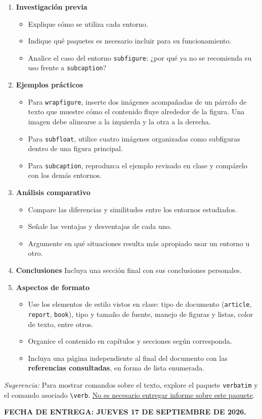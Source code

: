 \documentclass{article}
\begin{document}
\begin{enumerate}
    \item \textbf{Investigación previa}
    \begin{itemize}
        \item Explique cómo se utiliza cada entorno.  
        \item Indique qué paquetes es necesario incluir para su funcionamiento.  
        \item Analice el caso del entorno \texttt{subfigure}: ¿por qué ya no se recomienda su uso frente a \texttt{subcaption}?  
    \end{itemize}
    
    \item \textbf{Ejemplos prácticos}
    \begin{itemize}
        \item Para \texttt{wrapfigure}, inserte dos imágenes acompañadas de un párrafo de texto que muestre cómo el contenido fluye alrededor de la figura. Una imagen debe alinearse a la izquierda y la otra a la derecha.  
        \item Para \texttt{subfloat}, utilice cuatro imágenes organizadas como subfiguras dentro de una figura principal.  
        \item Para \texttt{subcaption}, reproduzca el ejemplo revisado en clase y compárelo con los demás entornos.  
    \end{itemize}
    
    \item \textbf{Análisis comparativo}
    \begin{itemize}
        \item Compare las diferencias y similitudes entre los entornos estudiados.  
        \item Señale las ventajas y desventajas de cada uno.  
        \item Argumente en qué situaciones resulta más apropiado usar un entorno u otro.  
    \end{itemize}
    
    \item \textbf{Conclusiones}  
    Incluya una sección final con sus conclusiones personales.  
    
    \item \textbf{Aspectos de formato}
    \begin{itemize}
        \item Use los elementos de estilo vistos en clase: tipo de documento (\texttt{article}, \texttt{report}, \texttt{book}), tipo y tamaño de fuente, manejo de figuras y listas, color de texto, entre otros.  
        \item Organice el contenido en capítulos y secciones según corresponda.  
        \item Incluya una página independiente al final del documento con las \textbf{referencias consultadas}, en forma de lista enumerada.  
    \end{itemize}
\end{enumerate}

\textit{Sugerencia:} Para mostrar comandos sobre el texto, explore el paquete \verb|verbatim| y el comando asociado \verb|\verb|. \underline{No es necesario entregar informe sobre este paquete}.

\vspace{5mm}
\textbf{FECHA DE ENTREGA: JUEVES 17 DE SEPTIEMBRE DE 2026.}
\end{document}
